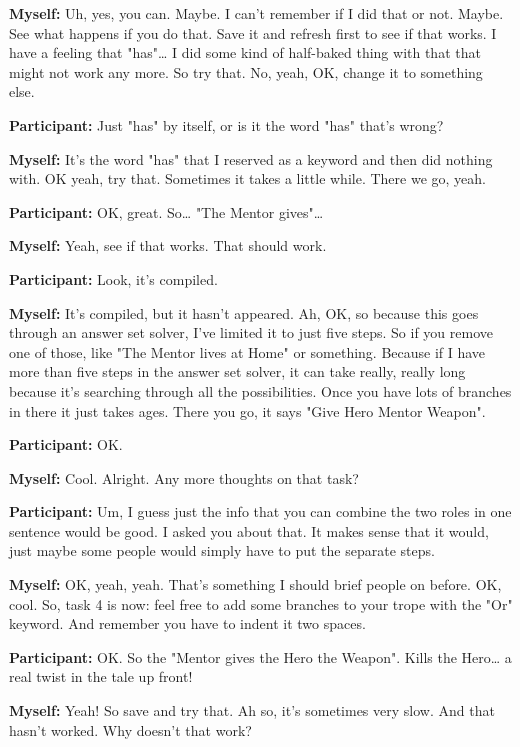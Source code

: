 \documentclass[11pt]{report}
\newcommand{\llabel}[1]{\hypertarget{llineno:#1}{\linelabel{#1}}}
\begin{document}
\begin{linenumbers}
\textbf{Myself:} Uh, yes, you can. Maybe. I can't remember if I did that or not. Maybe. See what happens if you do that. Save it and refresh first to see if that works. I have a feeling that "has"\ldots{} I did some kind of half-baked thing with that that might not work any more. So try that. No, yeah, OK, change it to something else.

\textbf{Participant:} Just "has" by itself, or is it the word "has" that's
wrong?\llabel{lne:feature2a2}

\textbf{Myself:} It's the word "has" that I reserved as a keyword and then did nothing with. OK yeah, try that. Sometimes it takes a little while. There we go, yeah.

\textbf{Participant:} OK, great. So\ldots{} "The Mentor gives"\ldots{}

\textbf{Myself:} Yeah, see if that works. That should work.

\textbf{Participant:} Look, it's compiled.

\textbf{Myself:} It's compiled, but it hasn't appeared. Ah, OK, so because this
goes through an answer set solver, I've limited it to just five steps. So if you
remove one of those, like "The Mentor lives at Home" or something. Because if I
have more than five steps in the answer set solver, it can take really, really
long because it's searching through all the possibilities. Once you have lots of
branches in there it just takes ages. There you go, it says "Give Hero Mentor
Weapon".\llabel{lne:bug1a}

\textbf{Participant:} OK.

\textbf{Myself:} Cool. Alright. Any more thoughts on that task?

\textbf{Participant:} Um, I guess just the info that you can combine the two roles in one sentence would be good. I asked you about that. It makes sense that it would, just maybe some people would simply have to put the separate steps.

\textbf{Myself:} OK, yeah, yeah. That's something I should brief people on before. OK, cool. So, task 4 is now: feel free to add some branches to your trope with the "Or" keyword. And remember you have to indent it two spaces.

\textbf{Participant:} OK. So the "Mentor gives the Hero the Weapon". Kills the Hero\ldots{} a real twist in the tale up front!

\textbf{Myself:} Yeah! So save and try that. Ah so, it's sometimes very slow. And that hasn't worked. Why doesn't that work?


\end{linenumbers}
\end{document}
